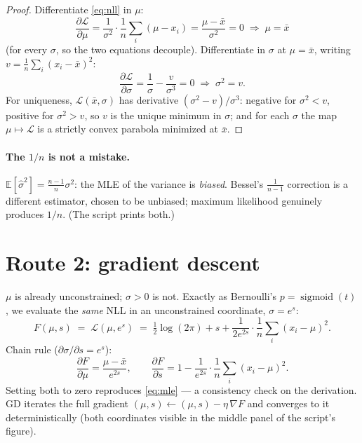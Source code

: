 \documentclass[11pt]{article}
\newcommand{\xbar}{\bar{x}}
\begin{document}
\begin{proof}
Differentiate \eqref{eq:nll} in $\mu$:
\begin{equation*}
  \frac{\partial\mathcal{L}}{\partial\mu}
  = \frac{1}{\sigma^2}\cdot\frac1n\sum_i(\mu - x_i)
  = \frac{\mu-\xbar}{\sigma^2} = 0
  \;\Longrightarrow\; \mu = \xbar
\end{equation*}
(for every $\sigma$, so the two equations decouple). Differentiate in
$\sigma$ at $\mu=\xbar$, writing $v = \tfrac1n\sum_i (x_i-\xbar)^2$:
\begin{equation*}
  \frac{\partial\mathcal{L}}{\partial\sigma}
  = \frac{1}{\sigma} - \frac{v}{\sigma^{3}} = 0
  \;\Longrightarrow\; \sigma^{2} = v .
\end{equation*}
For uniqueness, $\mathcal{L}(\xbar,\sigma)$ has derivative
$(\sigma^2-v)/\sigma^3$: negative for $\sigma^2<v$, positive for
$\sigma^2>v$, so $v$ is the unique minimum in $\sigma$; and for each
$\sigma$ the map $\mu\mapsto\mathcal{L}$ is a strictly convex parabola
minimized at $\xbar$.
\end{proof}

\paragraph{The $1/n$ is not a mistake.}
$\mathbb{E}[\hat\sigma^2] = \tfrac{n-1}{n}\sigma^2$: the MLE of the
variance is \emph{biased}. Bessel's $\tfrac{1}{n-1}$ correction is a
different estimator, chosen to be unbiased; maximum likelihood genuinely
produces $1/n$. (The script prints both.)

\section{Route 2: gradient descent}

$\mu$ is already unconstrained; $\sigma>0$ is not. Exactly as Bernoulli's
$p=\operatorname{sigmoid}(t)$, we evaluate the \emph{same} NLL in an
unconstrained coordinate, $\sigma = e^{s}$:
\begin{equation}
  F(\mu, s) \;=\; \mathcal{L}(\mu, e^{s})
  \;=\; \tfrac12\log(2\pi) + s
        + \frac{1}{2e^{2s}}\cdot\frac1n\sum_i (x_i-\mu)^2 .
  \label{eq:reparam}
\end{equation}
Chain rule ($\partial\sigma/\partial s = e^s$):
\begin{equation}
  \frac{\partial F}{\partial \mu} = \frac{\mu-\xbar}{e^{2s}},
  \qquad
  \frac{\partial F}{\partial s}
  = 1 - \frac{1}{e^{2s}}\cdot\frac1n\sum_i (x_i-\mu)^2 .
  \label{eq:grad}
\end{equation}
Setting both to zero reproduces \eqref{eq:mle} — a consistency check on
the derivation. GD iterates the full gradient
$(\mu, s) \leftarrow (\mu, s) - \eta\,\nabla F$ and converges to it
deterministically (both coordinates visible in the middle panel of the
script's figure).
\end{document}
